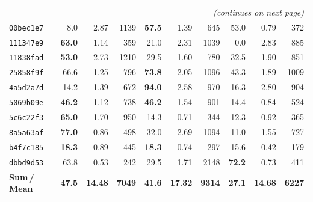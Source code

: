 \documentclass[10pt]{article}
\begin{document}
\begin{longtable}{@{}
    l
    | r r r
    | r r r
    | r r r
  @{}}
\midrule
\multicolumn{10}{r}{\footnotesize\itshape (continues on next page)}\\
\endfoot

\bottomrule
\endlastfoot

%

\texttt{00bec1e7}
  &  8.0 & 2.87 & 1139
  & \textbf{57.5} & 1.39 & 645
  & 53.0 & 0.79 & 372 \\

\texttt{111347e9}
  & \textbf{63.0} & 1.14 & 359
  & 21.0 & 2.31 & 1039
  &  0.0 & 2.83 & 885 \\

\texttt{11838fad}
  & \textbf{53.0} & 2.73 & 1210
  & 29.5 & 1.60 & 780
  & 32.5 & 1.90 & 851 \\

\texttt{25858f9f}
  & 66.6 & 1.25 & 796
  & \textbf{73.8} & 2.05 & 1096
  & 43.3 & 1.89 & 1009 \\

\texttt{4a5d2a7d}
  & 14.2 & 1.39 & 672
  & \textbf{94.0} & 2.58 & 970
  & 16.3 & 2.80 & 904 \\

\texttt{5069b09e}
  & \textbf{46.2} & 1.12 & 738
  & \textbf{46.2} & 1.54 & 901
  & 14.4 & 0.84 & 524 \\  %

\texttt{5c6c22f3}
  & \textbf{65.0} & 1.70 & 950
  & 14.3 & 0.71 & 344
  & 12.3 & 0.92 & 365 \\

\texttt{8a5a63af}
  & \textbf{77.0} & 0.86 & 498
  & 32.0 & 2.69 & 1094
  & 11.0 & 1.55 & 727 \\

\texttt{b4f7c185}
  & \textbf{18.3} & 0.89 & 445
  & \textbf{18.3} & 0.74 & 297
  & 15.6 & 0.42 & 179 \\  %

\texttt{dbbd9d53}
  & 63.8 & 0.53 & 242
  & 29.5 & 1.71 & 2148
  & \textbf{72.2} & 0.73 & 411 \\

\midrule
\rowcolor{totalbg}
\textbf{Sum\,/\,Mean}
  & \textbf{47.5} & \textbf{14.48} & \textbf{7049}
  & \textbf{41.6} & \textbf{17.32} & \textbf{9314}
  & \textbf{27.1} & \textbf{14.68} & \textbf{6227} \\

\end{longtable}
\end{document}
